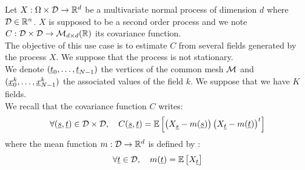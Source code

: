 \renewcommand{\filename}{docUC_StocProc_NonStationaryCovarianceFunction_Estimation.tex}
\renewcommand{\filetitle}{UC : Estimation of a non stationary covariance function}

\HeaderIIILevel


Let $X: \Omega \times {\mathcal D} \rightarrow {\mathbb R}^d$  be a multivariate  normal process of dimension $d$ where ${\mathcal D} \in {\mathbb R}^n$. $X$ is supposed to be a second order process and we note  $C : {\mathcal D} \times  {\mathcal D} \rightarrow  \mathcal{M}_{d \times d}(\mathbb{R})$ its covariance function.\\

The objective of this use case is to estimate $C$ from several fields generated by the process $X$. We suppose that the process is not stationary. \\

We denote $({\underline{t}}_0, \dots, {\underline{t}}_{N-1})$ the vertices of the common mesh ${\mathcal M}$ and $({\underline{x}}_0^k, \dots, {\underline{x}}_{N-1}^k)$ the associated values of the field $k$. We suppose that we have $K$ fields.\\

We recall that the covariance function $C$ writes:
\begin{equation}\label{covFunc}
  \forall ({\underline{s}}, {\underline{t}}) \in {\mathcal D} \times {\mathcal D}, \quad C({\underline{s}}, {\underline{t}}) = {\mathbb E}\left[ \left(X_{{\underline{s}}}-m({\underline{s}})\right)\left(X_{{\underline{t}}}-m({\underline{t}})\right)^t \right]
\end{equation}
where the mean function $m: {\mathcal D} \rightarrow {\mathbb R}^d$ is defined by :
\begin{equation}\label{meanFunc}
  \forall  {\underline{t}}\in {\mathcal D} , \quad m({\underline{t}}) = {\mathbb E}\left[ X_{{\underline{t}}} \right]
\end{equation}

